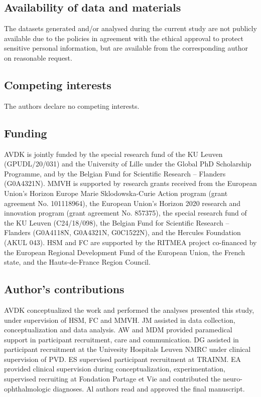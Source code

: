\documentclass{article}
\begin{document}
\subsection*{Availability of data and materials}

The datasets generated and/or analysed during the current study are not publicly
available due to the policies in agreement with the ethical approval to protect
sensitive personal information, but are available from the corresponding author
on reasonable request.

\subsection*{Competing interests}
The authors declare no competing interests.

\subsection*{Funding}
AVDK is jointly funded by the special research fund of the KU Leuven (GPUDL/20/031) and
the University of Lille under the Global PhD Scholarship Programme, and by
the Belgian Fund for Scientific Research – Flanders (G0A4321N).
MMVH is supported by research grants received from the European Union’s
Horizon Europe Marie Sklodowska-Curie Action program
(grant agreement No. 101118964), the European Union’s Horizon 2020 research and
innovation program (grant agreement No. 857375), the special research fund of
the KU Leuven (C24/18/098), the Belgian Fund for Scientific Research – Flanders
(G0A4118N, G0A4321N, G0C1522N), and the Hercules Foundation (AKUL 043).
HSM and FC are supported by the RITMEA project co-financed by the
European Regional Development Fund of the European Union, the French state,
and the Hauts-de-France Region Council.

\subsection*{Author's contributions}
AVDK conceptualized the work and performed the analyses
presented this study, under supervision of HSM, FC and MMVH.
JM assisted in data collection, conceptualization and data analysis.
AW and MDM provided paramedical support in participant recruitment,
care and communication.
DG assisted in participant recruitment at the Univesity Hospitals Leuven NMRC under clinical supervision of PVD.
ES supervised participant recruitment at TRAINM.
EA provided clinical supervision during conceptualization, experimentation, supervised recruiting at Fondation Partage et Vie and contributed the neuro-ophthalmologic diagnoses.
Al authors read and approved the final manuscript.
\end{document}
